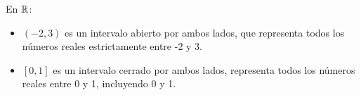 \begin{fmd-example}[Intervalos]
	En $\mathbb{R}$:
	\begin{itemize}
		\item $(-2, 3)$ es un intervalo abierto por ambos lados, que representa todos los números reales estrictamente entre -2 y 3.
		\item $[0, 1]$ es un intervalo cerrado por ambos lados, representa todos los números reales entre 0 y 1, incluyendo 0 y 1.
	\end{itemize}
\end{fmd-example}



